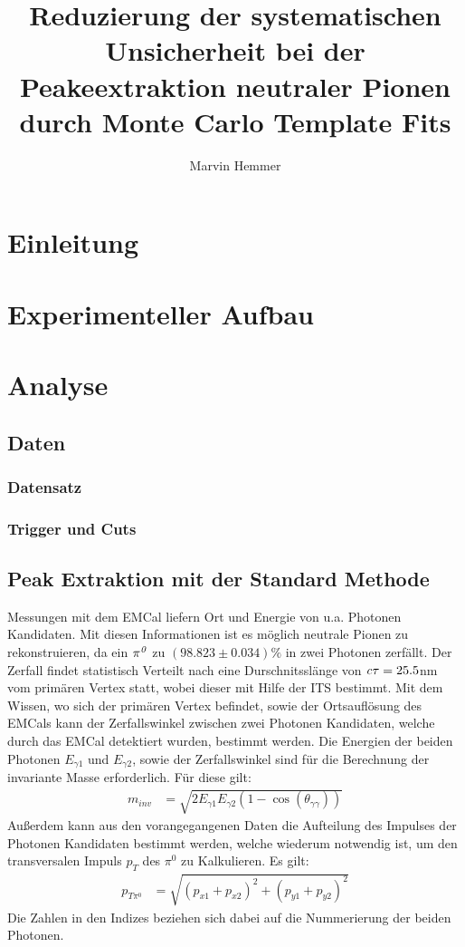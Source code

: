\documentclass[]{article}
\title{Reduzierung der systematischen Unsicherheit bei der Peakeextraktion neutraler Pionen durch Monte Carlo Template Fits}
\author{Marvin Hemmer}
\begin{document}
\maketitle
\newpage
\tableofcontents
\newpage

	\section{Einleitung}

	\section{Experimenteller Aufbau}

	\section{Analyse}
	\subsection{Daten}
	\subsubsection{Datensatz}
	\subsubsection{Trigger und Cuts}
	\subsection{Peak Extraktion mit der Standard Methode}
	Messungen mit dem EMCal liefern Ort und Energie von u.a. Photonen Kandidaten. Mit diesen Informationen ist es m{\"o}glich neutrale Pionen zu rekonstruieren, da ein ${\it \pi^{0}}$ zu $\left( 98.823\pm0.034\right)\%$ in zwei Photonen zerf{\"a}llt. Der Zerfall findet statistisch Verteilt nach eine Durschnitssl{\"a}nge von ${\it c\tau} = 25.5$nm vom prim{\"a}ren Vertex statt, wobei dieser mit Hilfe der ITS bestimmt.
	Mit dem Wissen, wo sich der prim{\"a}ren Vertex befindet, sowie der Ortsaufl{\"o}sung des EMCals kann der Zerfallswinkel zwischen zwei Photonen Kandidaten, welche durch das EMCal detektiert wurden, bestimmt werden.
	Die Energien der beiden Photonen $E_{\gamma1}$ und $E_{\gamma2}$, sowie der Zerfallswinkel sind f{\"u}r die Berechnung der invariante Masse erforderlich. F{\"u}r diese gilt:
	\begin{align}
	\label{eq_invmass}
	m_{inv} &= \sqrt{2E_{\gamma1}E_{\gamma2}(1-\cos\left( \theta_{\gamma\gamma}\right) )} 
	\end{align}
	Au{\ss}erdem kann aus den vorangegangenen Daten die Aufteilung des Impulses der Photonen Kandidaten bestimmt werden, welche wiederum notwendig ist, um den transversalen Impuls $p_{T}$ des $\pi^{0}$ zu Kalkulieren.
	Es gilt:
	\begin{align}
	\label{eq_pt}
	p_{T\pi^{0}} &= \sqrt{\left(p_{x1}+p_{x2}\right)^{2} +\left(p_{y1}+p_{y2}\right)^{2}} 
	\end{align}
	Die Zahlen in den Indizes beziehen sich dabei auf die Nummerierung der beiden Photonen.
	
\end{document}
